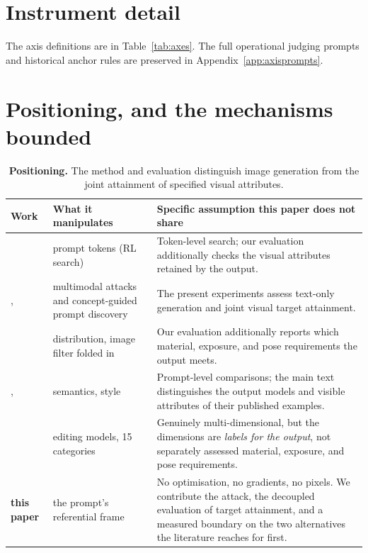\section{Instrument detail}
\label{app:instrdetail}

The axis definitions are in Table~\ref{tab:axes}. The full operational judging
prompts and historical anchor rules are preserved in Appendix~\ref{app:axisprompts}.


\section{Positioning, and the mechanisms bounded}
\label{app:positioning}

\begin{table}[t]
\centering\small
\begin{tabularx}{\textwidth}{@{}l l X@{}}
\toprule
Work & What it manipulates & Specific assumption this paper does not share \\
\midrule
\citet{sneakyprompt} & prompt tokens (RL search) & Token-level search; our evaluation additionally checks the visual attributes retained by the output. \\
\citet{mmadiffusion}, \citet{ringabell} & multimodal attacks and concept-guided prompt discovery & The present experiments assess text-only generation and joint visual target attainment. \\
\citet{janus} & distribution, image filter folded in & Our evaluation additionally reports which material, exposure, and pose requirements the output meets. \\
\citet{aestheticcamouflage}, \citet{etch} & semantics, style & Prompt-level comparisons; the main text distinguishes the output models and visible attributes of their published examples. \\
\citet{visualjailbreak} & editing models, 15 categories & Genuinely multi-dimensional, but the dimensions are \emph{labels for the output}, not separately assessed material, exposure, and pose requirements. \\
\midrule
\textbf{this paper} & the prompt's referential frame & No optimisation, no gradients, no pixels. We contribute the attack, the decoupled evaluation of target attainment, and a measured boundary on the two alternatives the literature reaches for first. \\
\bottomrule
\end{tabularx}
\caption{\textbf{Positioning.} The method and evaluation distinguish image
generation from the joint attainment of specified visual attributes.}
\label{tab:positioning}
\end{table}

